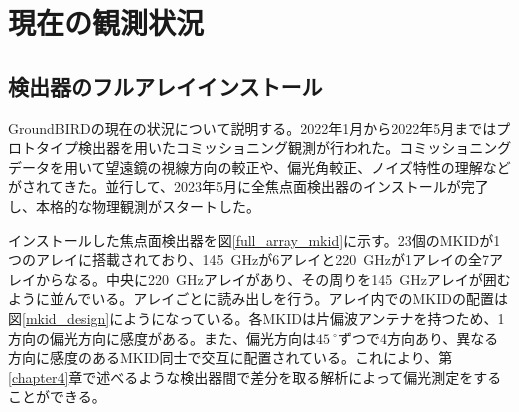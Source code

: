 \section{現在の観測状況}

\subsection{検出器のフルアレイインストール}
\label{full_array}
GroundBIRDの現在の状況について説明する。2022年1月から2022年5月まではプロトタイプ検出器を用いたコミッショニング観測が行われた。コミッショニングデータを用いて望遠鏡の視線方向の較正\cite{sueno_paper}や、偏光角較正、ノイズ特性の理解\cite{sueno_doctor}などがされてきた。並行して、2023年5月に全焦点面検出器のインストールが完了し、本格的な物理観測がスタートした。

インストールした焦点面検出器を図\ref{full_array_mkid}に示す。23個のMKIDが1つのアレイに搭載されており、\SI{145}{GHz}が6アレイと\SI{220}{GHz}が1アレイの全7アレイからなる。中央に\SI{220}{GHz}アレイがあり、その周りを\SI{145}{GHz}アレイが囲むように並んでいる。アレイごとに読み出しを行う。アレイ内でのMKIDの配置は図\ref{mkid_design}にようになっている。各MKIDは片偏波アンテナを持つため、1方向の偏光方向に感度がある。また、偏光方向は$\SI{45}{^{\circ}}$ずつで4方向あり、異なる方向に感度のあるMKID同士で交互に配置されている。これにより、第\ref{chapter4}章で述べるような検出器間で差分を取る解析によって偏光測定をすることができる。

